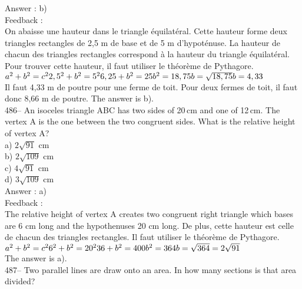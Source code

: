 \documentclass[letterpaper, 12pt]{article}
\begin{document}
Answer : b)\\

Feedback :\\
On abaisse une hauteur dans le triangle \'equilat\'eral.  Cette hauteur
forme deux triangles rectangles de 2,5 m de base et de 5 m d'hypot\'enuse.
La hauteur de chacun des triangles rectangles correspond \`a la hauteur du
triangle \'equilat\'eral.  Pour trouver cette hauteur, il faut utiliser le
th\'eor\`eme de Pythagore.\\

$a^{2}+b^{2}=c^{2}\\
2,5^{2}+b^{2}=5^{2}\\
6,25+b^{2}=25\\
b^{2}=18,75\\
b=\sqrt{18,75}\\
b=4,33$\\
Il faut 4,33 m de poutre pour une ferme de toit.  Pour deux fermes de toit,
il faut donc 8,66 m de poutre.  The answer is b).\\


486-- An isoceles triangle ABC has two sides of 20\,cm and one of 12\,cm. The vertex A is the one between the two congruent sides. What is the relative height of vertex A?\\
a) $2\sqrt{91}$ cm\\
b) $2\sqrt{109}$ cm\\
c) $4\sqrt{91}$ cm\\
d) $3\sqrt{109}$ cm\\

Answer : a)\\

Feedback : \\
The relative height of vertex A creates two congruent right triangle which bases are 6 cm long and the hypothenuses 20 cm long. De plus, cette
hauteur est celle de chacun des triangles rectangles.  Il faut utiliser le
th\'eor\`eme de Pythagore.\\
$a^{2}+b^{2}=c^{2}\\
6^{2}+b^{2}=20^{2}\\
36+b^{2}=400\\
b^{2}=364\\
b=\sqrt{364}=2\sqrt{91}$\\
The answer is a).\\

487-- Two parallel lines are draw onto an area. In how many sections is that area divided?\\
\end{document}
